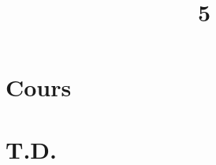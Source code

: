 \documentclass[a4paper]{article}
\title{5}{Suites de fonctions}
\begin{document}
	\part{Cours}
	
	
	
	
	
	\clearpage\null\clearpage
	\renewcommand{\thesection}{}
	\renewcommand{\thesubsection}{}
	\part{T.D.}
	
\end{document}
